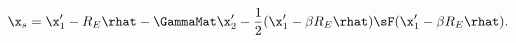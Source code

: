 \begin{equation}
\label{eqn:backgroundorder3}
\x_s= \x'_1 - R_E\rhat -  \GammaMat\x'_2 - \frac{1}{2}(\x'_1 - \beta R_E\rhat) \sF (\x'_1 - \beta R_E \rhat).
\end{equation}
  